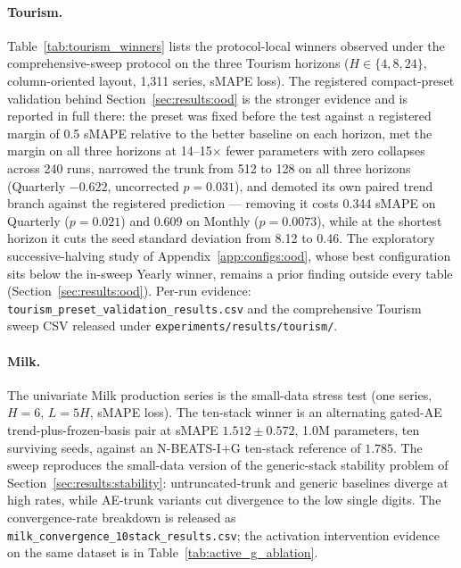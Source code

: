 \paragraph{Tourism.} Table~\ref{tab:tourism_winners} lists the
protocol-local winners observed under the comprehensive-sweep protocol on
the three Tourism horizons ($H \in \{4, 8, 24\}$, column-oriented layout,
1{,}311 series, sMAPE loss). The registered compact-preset validation behind
Section~\ref{sec:results:ood} is the stronger evidence and is reported in
full there: the preset was fixed before the test against a registered
margin of 0.5 sMAPE relative to the better baseline on each horizon, met
the margin on all three horizons at 14--15$\times$ fewer parameters with
zero collapses across 240 runs, narrowed the trunk from 512 to 128 on all
three horizons (Quarterly $-0.622$, uncorrected $p = 0.031$), and demoted
its own paired trend branch against the registered prediction --- removing
it costs 0.344 sMAPE on Quarterly ($p = 0.021$) and 0.609 on Monthly
($p = 0.0073$), while at the shortest horizon it cuts the seed standard
deviation from 8.12 to 0.46. The exploratory successive-halving study of
Appendix~\ref{app:configs:ood}, whose best configuration sits below the
in-sweep Yearly winner, remains a prior finding outside every table
(Section~\ref{sec:results:ood}). Per-run evidence:
\texttt{tourism\_preset\_validation\_results.csv} and the comprehensive
Tourism sweep CSV released under \texttt{experiments/results/tourism/}.

\paragraph{Milk.} The univariate Milk production series is the small-data
stress test (one series, $H = 6$, $L = 5H$, sMAPE loss). The ten-stack
winner is an alternating gated-AE trend-plus-frozen-basis pair at sMAPE
$1.512 \pm 0.572$, 1.0M parameters, ten surviving seeds, against an
N-BEATS-I+G ten-stack reference of $1.785$. The sweep reproduces the
small-data version of the generic-stack stability problem of
Section~\ref{sec:results:stability}: untruncated-trunk and generic
baselines diverge at high rates, while AE-trunk variants cut divergence to
the low single digits. The convergence-rate breakdown is released as
\texttt{milk\_convergence\_10stack\_results.csv}; the activation
intervention evidence on the same dataset is in
Table~\ref{tab:active_g_ablation}.

